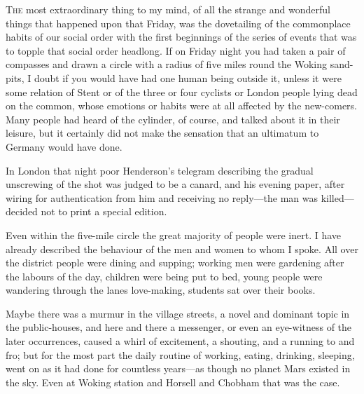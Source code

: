 


\lettrine[lines=4,findent=2pt]{T}{he} most extraordinary thing to my mind, of all the strange and wonderful things that happened upon that Friday, was the dovetailing of the commonplace habits of our social order with the first beginnings of the series of events that was to topple that social order headlong. If on Friday night you had taken a pair of compasses and drawn a circle with a radius of five miles round the Woking sand-pits, I doubt if you would have had one human being outside it, unless it were some relation of Stent or of the three or four cyclists or London people lying dead on the common, whose emotions or habits were at all affected by the new-comers. Many people had heard of the cylinder, of course, and talked about it in their leisure, but it certainly did not make the sensation that an ultimatum to Germany would have done.

In London that night poor Henderson's telegram describing the gradual unscrewing of the shot was judged to be a canard, and his evening paper, after wiring for authentication from him and receiving no reply—the man was killed—decided not to print a special edition.

Even within the five-mile circle the great majority of people were inert. I have already described the behaviour of the men and women to whom I spoke. All over the district people were dining and supping; working men were gardening after the labours of the day, children were being put to bed, young people were wandering through the lanes love-making, students sat over their books.

Maybe there was a murmur in the village streets, a novel and dominant topic in the public-houses, and here and there a messenger, or even an eye-witness of the later occurrences, caused a whirl of excitement, a shouting, and a running to and fro; but for the most part the daily routine of working, eating, drinking, sleeping, went on as it had done for countless years—as though no planet Mars existed in the sky. Even at Woking station and Horsell and Chobham that was the case.

